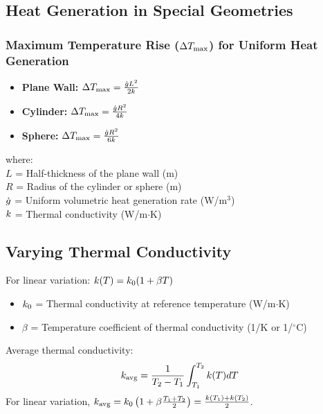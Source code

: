 \subsection{Heat Generation in Special Geometries}
\subsubsection*{Maximum Temperature Rise ($\Delta T_{\text{max}}$) for Uniform Heat Generation}
\begin{itemize}
    \item \textbf{Plane Wall:} $\Delta T_{\text{max}} = \frac{\dot{g} L^2}{2k}$
    \item \textbf{Cylinder:} $\Delta T_{\text{max}} = \frac{\dot{g} R^2}{4k}$
    \item \textbf{Sphere:} $\Delta T_{\text{max}} = \frac{\dot{g} R^2}{6k}$
\end{itemize}
where: \\
$L$ = Half-thickness of the plane wall (m) \\
$R$ = Radius of the cylinder or sphere (m) \\
$\dot{g}$ = Uniform volumetric heat generation rate (W/m$^3$) \\
$k$ = Thermal conductivity (W/m$\cdot$K)

\subsection{Varying Thermal Conductivity}
For linear variation: $k(T) = k_0 (1 + \beta T)$
\begin{itemize}
    \item $k_0$ = Thermal conductivity at reference temperature (W/m$\cdot$K)
    \item $\beta$ = Temperature coefficient of thermal conductivity (1/K or 1/$^\circ$C)
\end{itemize}
Average thermal conductivity:
\begin{equation}
    k_{\text{avg}} = \frac{1}{T_2-T_1} \int_{T_1}^{T_2} k(T) dT
\end{equation}
For linear variation, $k_{\text{avg}} = k_0 \left(1 + \beta \frac{T_1 + T_2}{2}\right) = \frac{k(T_1) + k(T_2)}{2}$.


